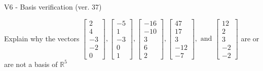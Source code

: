 \begin{exercise}
  \begin{exerciseTitle}V6 - Basis verification (ver. 37)\end{exerciseTitle}
  \begin{exerciseStatement}
    Explain why the vectors \(\left[\begin{array}{r}
2 \\
4 \\
-3 \\
-2 \\
0
\end{array}\right] , \left[\begin{array}{r}
-5 \\
1 \\
-3 \\
0 \\
1
\end{array}\right] , \left[\begin{array}{r}
-16 \\
-10 \\
3 \\
6 \\
2
\end{array}\right] , \left[\begin{array}{r}
47 \\
17 \\
3 \\
-12 \\
-7
\end{array}\right] , \text{ and } \left[\begin{array}{r}
12 \\
2 \\
3 \\
-2 \\
-2
\end{array}\right]\) are or are not a basis of \(\mathbb{R}^5\)	



\end{exerciseStatement}
\end{exercise}
